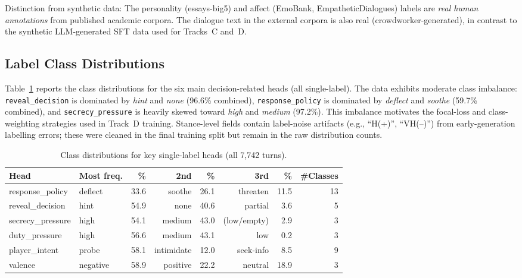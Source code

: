 \documentclass[11pt]{article}
\begin{document}
Distinction from synthetic data: The personality (essays-big5) and affect (EmoBank, EmpatheticDialogues) labels are \textit{real human annotations} from published academic corpora.
The dialogue text in the external corpora is also real (crowdworker-generated), in contrast to the synthetic LLM-generated SFT data used for Tracks~C and~D.

\subsection{Label Class Distributions}

Table~\ref{tab:label_dist} reports the class distributions for the six main decision-related heads (all single-label).
The data exhibits moderate class imbalance: \texttt{reveal\_decision} is dominated by \textit{hint} and \textit{none} (96.6\% combined), \texttt{response\_policy} is dominated by \textit{deflect} and \textit{soothe} (59.7\% combined), and \texttt{secrecy\_pressure} is heavily skewed toward \textit{high} and \textit{medium} (97.2\%).
This imbalance motivates the focal-loss and class-weighting strategies used in Track~D training.
Stance-level fields contain label-noise artifacts (e.g., ``H(+)'', ``VH(--)'') from early-generation labelling errors; these were cleaned in the final training split but remain in the raw distribution counts.

\begin{table}[tp]
\centering
\caption{Class distributions for key single-label heads (all 7,742 turns).}
\label{tab:label_dist}
\footnotesize\setlength{\tabcolsep}{2.5pt}
\begin{tabular}{@{}llrrrrrr@{}}
\toprule
\textbf{Head} & \textbf{Most freq.} & \textbf{\%} & \textbf{2nd} & \textbf{\%} & \textbf{3rd} & \textbf{\%} & \textbf{\#Classes} \\
\midrule
response\_policy  & deflect   & 33.6 & soothe    & 26.1 & threaten   & 11.5 & 13 \\
reveal\_decision   & hint      & 54.9 & none      & 40.6 & partial    &  3.6 & 5  \\
secrecy\_pressure  & high      & 54.1 & medium    & 43.0 & (low/empty)&  2.9 & 3  \\
duty\_pressure     & high      & 56.6 & medium    & 43.1 & low        &  0.2 & 3  \\
player\_intent     & probe     & 58.1 & intimidate& 12.0 & seek-info  &  8.5 & 9  \\
valence           & negative  & 58.9 & positive  & 22.2 & neutral    & 18.9 & 3  \\
\bottomrule
\end{tabular}
\end{table}
\end{document}
